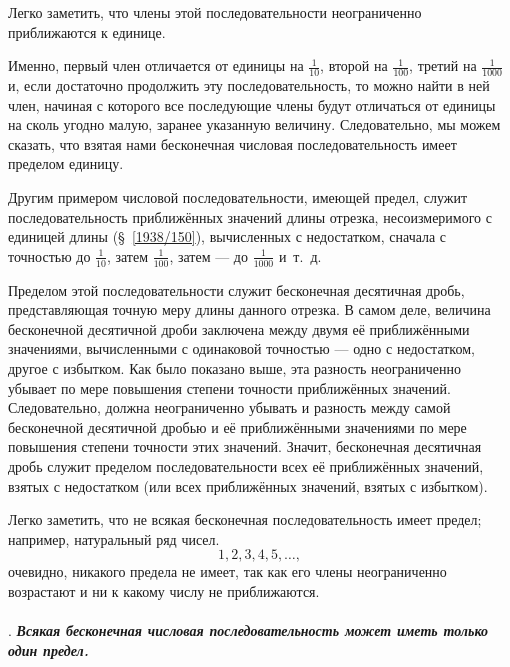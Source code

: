\documentclass[oneside]{book}
\begin{document}
Легко заметить, что члены этой последовательности неограниченно приближаются к единице.

Именно, первый член отличается от единицы на $\tfrac1{10}$, 
второй на $\tfrac1{100}$, третий на $\tfrac1{1000}$ и, если достаточно продолжить эту последовательность, то можно найти в ней член, начиная с которого все последующие члены будут отличаться от единицы на сколь угодно малую, заранее указанную величину.
Следовательно, мы можем сказать, что взятая нами бесконечная числовая последовательность имеет пределом единицу.

Другим примером числовой последовательности, имеющей предел, служит последовательность приближённых значений длины отрезка, несоизмеримого с единицей длины (§~\ref{1938/150}), вычисленных с недостатком, сначала с точностью до $\tfrac1{10}$, затем $\tfrac1{100}$, затем — до $\tfrac1{1000}$ и~т.~д.

Пределом этой последовательности служит бесконечная десятичная дробь, представляющая точную меру длины данного отрезка.
В самом деле, величина бесконечной десятичной дроби заключена между двумя её приближёнными значениями, вычисленными с одинаковой точностью — одно с недостатком, другое с избытком. 
Как было показано выше, эта разность неограниченно убывает по мере повышения степени точности приближённых значений.
Следовательно, должна неограниченно убывать и разность между самой бесконечной десятичной дробью и её приближёнными значениями по мере повышения степени точности этих значений.
Значит, бесконечная десятичная дробь служит пределом последовательности всех её приближённых значений, взятых с недостатком (или всех приближённых значений, взятых с избытком).

Легко заметить, что не всякая бесконечная последовательность имеет предел;
например, натуральный ряд чисел.
\[1, 2, 3, 4, 5,\dots,\]
очевидно, никакого предела не имеет, так как его члены неограниченно возрастают и ни к какому числу не приближаются.

\paragraph{}\label{1938/228}
.
\textbf{\emph{Всякая бесконечная числовая последовательность может иметь только один предел.}}
\end{document}
